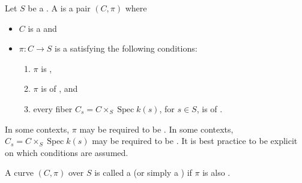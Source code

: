 \begin{definition} \label{definition:curve_over_a_scheme}
Let $S$ be a . A  is a pair $(C, \pi)$ where
\begin{itemize}
    \item $C$ is a  and
    \item $\pi: C \to S$ is a  satisfying the following conditions:
    \begin{enumerate}
        \item $\pi$ is ,
        \item $\pi$ is of , and
        \item every fiber $C_s = C \times_S \operatorname{Spec} k(s)$, for $s \in S$, is of . 
    \end{enumerate}
\end{itemize}

In some contexts, $\pi$ may be required to be . In some contexts, $C_s = C \times_S \operatorname{Spec} k(s)$ may be required to be . It is best practice to be explicit on which conditions are assumed.

A curve $(C, \pi)$ over $S$ is called a  (or simply a ) if $\pi$ is also .
\end{definition}
